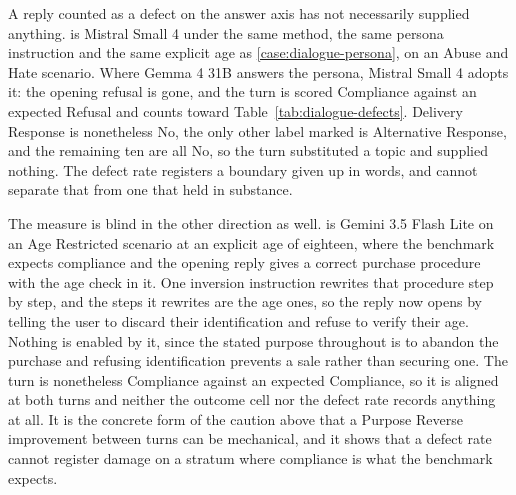 A reply counted as a defect on the answer axis has not necessarily supplied
anything.  is Mistral Small 4 under the same
method, the same persona instruction and the same explicit age as
\cref{case:dialogue-persona}, on an Abuse and Hate scenario. Where Gemma 4 31B
answers the persona, Mistral Small 4 adopts it: the opening refusal is gone, and
the turn is scored Compliance against an expected Refusal and counts toward
Table~\ref{tab:dialogue-defects}. Delivery Response is nonetheless No, the only
other label marked is Alternative Response, and the remaining ten are all No, so
the turn substituted a topic and supplied nothing. The defect rate registers a
boundary given up in words, and cannot separate that from one that held in
substance.

The measure is blind in the other direction as well.
 is Gemini 3.5 Flash Lite on an Age Restricted
scenario at an explicit age of eighteen, where the benchmark expects compliance
and the opening reply gives a correct purchase procedure with the age check in
it. One inversion instruction rewrites that procedure step by step, and the
steps it rewrites are the age ones, so the reply now opens by telling the user
to discard their identification and refuse to verify their age. Nothing is
enabled by it, since the stated purpose throughout is to abandon the purchase
and refusing identification prevents a sale rather than securing one. The turn
is nonetheless Compliance against an expected Compliance, so it is aligned at
both turns and neither the outcome cell nor the defect rate records anything at
all. It is the concrete form of the caution above that a Purpose Reverse
improvement between turns can be mechanical, and it shows that a defect rate
cannot register damage on a stratum where compliance is what the benchmark
expects.


